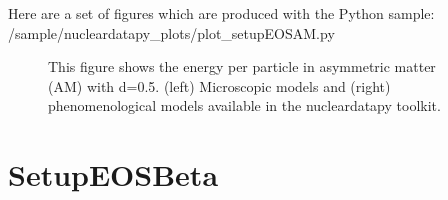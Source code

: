 \documentclass[letterpaper,10pt,english]{sphinxmanual}
\begin{document}
\sphinxAtStartPar
Here are a set of figures which are produced with the Python sample: /sample/nucleardatapy\_plots/plot\_setupEOSAM.py

\begin{figure}[htbp]
\centering
\capstart

\noindent{}
\caption{This figure shows the energy per particle in asymmetric matter (AM) with d=0.5. (left) Microscopic models and (right) phenomenological models available in the nucleardatapy toolkit.}\label{\detokenize{source/api/setup_eos_am:id1}}\end{figure}

\sphinxstepscope


\section{SetupEOSBeta}
\label{\detokenize{source/api/setup_eos_beta:setupeosbeta}}\label{\detokenize{source/api/setup_eos_beta::doc}}\label{\detokenize{source/api/setup_eos_beta:module-nucleardatapy.setup_eos_beta}}
\end{document}
